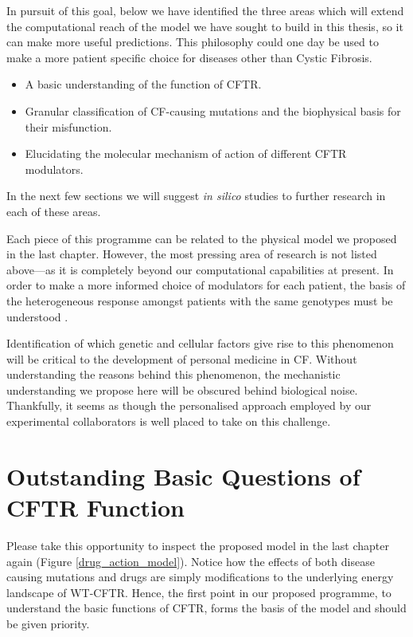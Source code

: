In pursuit of this goal, below we have identified the three areas which will extend the computational reach of the model we have sought to build in this thesis, so it can make more useful predictions. This philosophy could one day be used to make a more patient specific choice for diseases other than Cystic Fibrosis.

\begin{itemize}
	\item A basic understanding of the function of CFTR.
	\item Granular classification of CF-causing mutations and the biophysical basis for their misfunction.
	\item Elucidating the molecular mechanism of action of different CFTR modulators. 
\end{itemize}

In the next few sections we will suggest \textit{in silico} studies to further research in each of these areas. 

Each piece of this programme can be related to the physical model we proposed in the last chapter. However, the most pressing area of research is not listed above---as it is completely beyond our computational capabilities at present. In order to make a more informed choice of modulators for each patient, the basis of the heterogeneous response amongst patients with the same genotypes must be understood \cite{hanafin2021}. 

Identification of which genetic and cellular factors give rise to this phenomenon will be critical to the development of personal medicine in CF. Without understanding the reasons behind this phenomenon, the mechanistic understanding we propose here will be obscured behind biological noise. Thankfully, it seems as though the personalised approach employed by our experimental collaborators is well placed to take on this challenge.

\section{Outstanding Basic Questions of CFTR Function}

Please take this opportunity to inspect the proposed model in the last chapter again (Figure \ref{drug_action_model}). Notice how the effects of both disease causing mutations and drugs are simply modifications to the underlying energy landscape of WT-CFTR. Hence, the first point in our proposed programme, to understand the basic functions of CFTR, forms the basis of the model and should be given priority.

